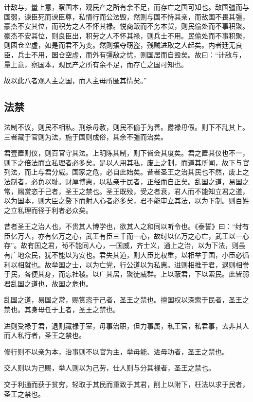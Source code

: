 \documentclass[]{article}
\begin{document}
计敌与，量上意，察国本，观民产之所有余不足，而存亡之国可知也。敌国彊而与国弱，谏臣死而谀臣尊，私情行而公法毁，然则与国不恃其亲，而敌国不畏其彊，豪杰不安其位，而积劳之人不怀其禄。悦商贩而不务本货，则民偷处而不事积聚。豪杰不安其位，则良臣出，积劳之人不怀其禄，则兵士不用。民偷处而不事积聚，则囷仓空虚，如是而君不为变。然则攘夺窃盗，残贼进取之人起矣。内者廷无良臣，兵士不用，囷仓空虚，而外有彊敌之忧，则国居而自毁矣。故曰：``计敌与，量上意，察国本，观民产之所有余不足，而存亡之国可知也。

故以此八者观人主之国，而人主毋所匿其情矣。''

\hypertarget{header-n248}{%
\subsection{法禁 }\label{header-n248}}

法制不议，则民不相私。刑杀毋赦，则民不偷于为善。爵禄毋假。则下不乱其上。三者藏于官则为法，施于国则成俗，其余不彊而治矣。

君壹置则仪，则百官守其法。上明陈其制，则下皆会其度矣。君之置其仪也不一，则下之倍法而立私理者必多矣。是以人用其私，废上之制，而道其所闻，故下与官列法，而上与君分威。国家之危，必自此始矣。昔者圣王之治其民也不然，废上之法制者，必负以耻。财厚博惠，以私亲于民者，正经而自正矣。乱国之道，易国之常，赐赏恣于己者，圣王之禁也。圣王既殁，受之者衰，君人而不能知立君之道，以为国本，则大臣之赘下而射人心者必多矣，君不能审立其法，以为下制。则百姓之立私理而径于利者必众矣。

昔者圣王之治人也，不贵其人博学也，欲其人之和同以听令也。《泰誓》曰：``纣有臣亿万人，亦有亿万之心，武王有臣三千而一心，故纣以亿万之心亡，武王以一心存''。故有国之君，茍不能同人心，一国威，齐士义，通上之治，以为下法，则虽有广地众民，犹不能以为安也。君失其道，则大臣比权重，以相举于国，小臣必循利以相就也。故举国之士，以为亡党，行公道以为私惠。进则相推于君，退则相誉于民，各便其身，而忘社稷。以广其居，聚徒威群。上以蔽君，下以索民。此皆弱君乱国之道也，故国之危也。

乱国之道，易国之常，赐赏恣于己者，圣王之禁也。擅国权以深索于民者，圣王之禁也。其身毋任于上者，圣王之禁也。

进则受禄于君，退则藏禄于室，毋事治职，但力事属，私王官，私君事，去非其人而人私行者，圣王之禁也。

修行则不以亲为本，治事则不以官为主，举毋能、进毋功者，圣王之禁也。

交人则以为己赐，举人则以为己劳，仕人则与分其禄者，圣王之禁也。

交于利通而获于贫穷，轻取于其民而重致于其君，削上以附下，枉法以求于民者，圣王之禁也。
\end{document}
